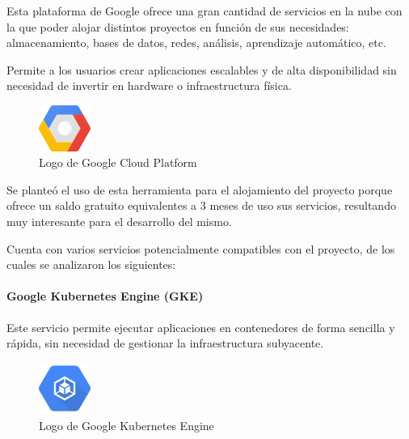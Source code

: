                 Esta plataforma de Google ofrece una gran cantidad de servicios en la nube con la que poder alojar distintos proyectos en función de sus necesidades: almacenamiento, bases de datos, redes, análisis, aprendizaje automático, etc.
                
                Permite a los usuarios crear aplicaciones escalables y de alta disponibilidad sin necesidad de invertir en hardware o infraestructura física.

                \begin{figure}[htbp]
                    \centering

                    \includegraphics[width=0.15\textwidth]{images/Logos/gcp.png}
                    \caption{Logo de Google Cloud Platform}

                    \label{fig:gcp-logo}
                \end{figure}

                Se planteó el uso de esta herramienta para el alojamiento del proyecto porque ofrece un saldo gratuito equivalentes a 3 meses de uso sus servicios, resultando muy interesante para el desarrollo del mismo.

                Cuenta con varios servicios potencialmente compatibles con el proyecto, de los cuales se analizaron los siguientes:

                \paragraph{Google Kubernetes Engine (GKE)}

                    Este servicio permite ejecutar aplicaciones en contenedores de forma sencilla y rápida, sin necesidad de gestionar la infraestructura subyacente.

                    \begin{figure}[htbp]
                        \centering

                        \includegraphics[width=0.15\textwidth]{images/Logos/gke.png}
                        \caption{Logo de Google Kubernetes Engine}
                        
                        \label{fig:gke-logo}
                    \end{figure}

